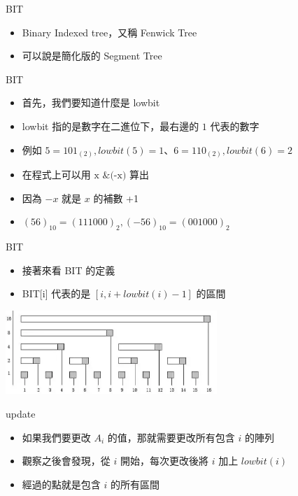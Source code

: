 \documentclass[aspectratio=169]{beamer}
\begin{document}
    \begin{frame}{BIT}
        \begin{itemize}
            \item Binary Indexed tree，又稱 Fenwick Tree
            \item 可以說是簡化版的 Segment Tree
        \end{itemize}
    \end{frame}

    \begin{frame}{BIT}
        \begin{itemize}
            \item 首先，我們要知道什麼是 lowbit
            \item lowbit 指的是數字在二進位下，最右邊的 $1$ 代表的數字
            \item 例如 $5 = 101_{(2)}, lowbit(5) = 1$、$6 = 110_{(2)}, lowbit(6) = 2$
            \item 在程式上可以用 $\text{x \& (-x)}$ 算出
            \item 因為 $-x$ 就是 $x$ 的補數 +1
            \item $
            (56)_{10} = (111000)_2,
            (-56)_{10} = (001000)_2$
        \end{itemize}
        
    \end{frame}

    \begin{frame}{BIT}
        \begin{itemize}
            \item 接著來看 BIT 的定義
            \item BIT[i] 代表的是 $[i, i + lowbit(i) - 1]$ 的區間
        \end{itemize}

        \includegraphics[width=0.6\textwidth]{img/BIT.png}
    \end{frame}

    \begin{frame}{update}
        \begin{itemize}
            \item 如果我們要更改 $A_i$ 的值，那就需要更改所有包含 $i$ 的陣列
            \item 觀察之後會發現，從 $i$ 開始，每次更改後將 $i$ 加上 $lowbit(i)$
            \item 經過的點就是包含 $i$ 的所有區間
        \end{itemize}
    \end{frame}
\end{document}
